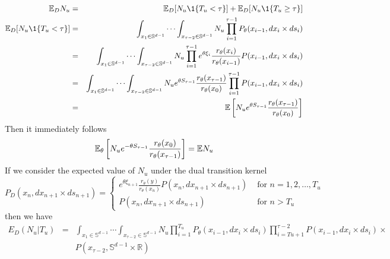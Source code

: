 \documentclass[12pt]{article}
\begin{document}
\begin{eqnarray*}
\E_D N_u &=& \E_D [N_u \1{T_u < \tau}] + \E_D [N_u \1{T_u \geq \tau}] \\
\E_D [N_u \1{T_u < \tau}] &=& \int_{x_1 \in \mathbb S^{d-1}} \cdots
\int_{x_{\tau-2} \in \mathbb S^{d-1}} N_u \prod_{i=1}^{\tau-1}
P_\theta(x_{i-1}, dx_i \times ds_i) \\ 
&=& \int_{x_1 \in \mathbb S^{d-1}} \cdots \int_{x_{\tau-2} \in \mathbb
  S^{d-1}} N_u \prod_{i=1}^{\tau-1} e^{\theta \xi_i} \frac{r_\theta
  (x_{i})}{r_\theta (x_{i-1})}P (x_{i-1}, dx_i \times ds_i) \\ 
&=& \int_{x_1 \in \mathbb S^{d-1}} \cdots \int_{x_{\tau-2} \in \mathbb
  S^{d-1}} N_u e^{\theta S_{\tau-1}} \frac{r_\theta
  (x_{\tau-1})}{r_\theta (x_{0})} \prod_{i=1}^{\tau-1} P (x_{i-1},
dx_i \times ds_i) \\
&=& \E \left[N_u e^{\theta S_{\tau-1}} \frac{r_\theta
    (x_{\tau-1})}{r_\theta (x_{0})}\right]
\end{eqnarray*}
Then it immediately follows
$$
\mathbb{E}_\theta \left[N_u e^{-\theta S_{\tau-1}} \frac{r_\theta (x_{0})}{r_\theta (x_{\tau-1})}\right] = \mathbb{E} N_u
$$
If we consider the expected value of $N_u$ under the dual transition kernel
$$
P_D(x_n, dx_{n+1} \times ds_{n+1}) =
\left\{
\begin{array}{ll}
e^{\theta \xi_{n+1}} \frac{r_\theta(y)}{r_\theta(x_n)} P(x_n, dx_{n+1} \times ds_{n+1}) &
\text{ for }n=1,2,\dots,T_u \\
P(x_n, dx_{n+1} \times ds_{n+1}) & \text{ for } n > T_u 
\end{array}
\right.
$$
then we have
\begin{eqnarray*}
E_D(N_u | T_u) &=& \int_{x_1 \in \mathbb S^{d-1}} \cdots
\int_{x_{\tau-2} \in \mathbb S^{d-1}} N_u \prod_{i=1}^{T_u}
P_\theta(x_{i-1}, dx_i \times ds_i) \prod_{i=Tu + 1}^{\tau-2}
P(x_{i-1}, dx_i \times ds_i) \times \\
&& P(x_{\tau-2}, \mathbb S^{d-1} \times \mathbb R)
\end{eqnarray*}


\end{document}
